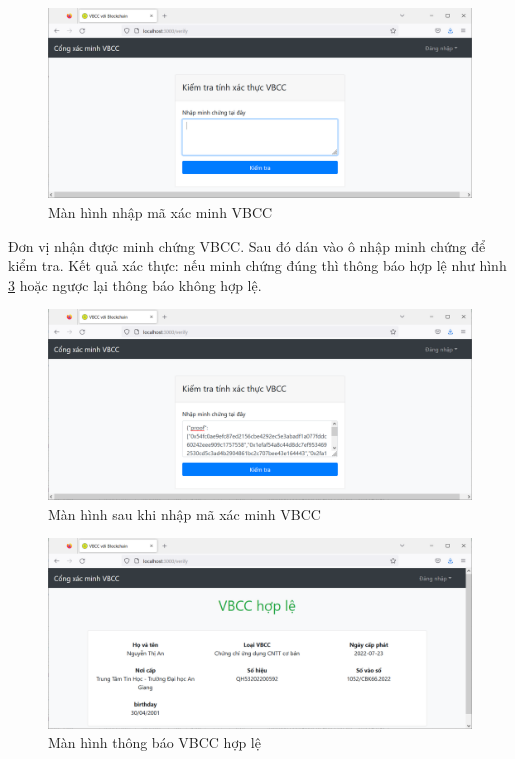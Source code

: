 \begin{figure}[H]
\centering
\includegraphics[width=.9\linewidth]{img/manhinh_donvixacminh_vbegin.PNG}
\caption{Màn hình nhập mã xác minh VBCC}
\label{fig:manhinh_donvixacminh_vbegin}
\end{figure}


Đơn vị nhận được minh chứng VBCC. 
Sau đó dán vào ô nhập minh chứng để kiểm tra.
Kết quả xác thực: nếu minh chứng đúng thì thông báo hợp lệ như hình \ref{fig:xacminh_hople} hoặc ngược lại thông báo không hợp lệ.
\begin{figure}[H]
\centering
\includegraphics[width=.9\linewidth]{img/v_begin.PNG}
\caption{Màn hình sau khi nhập mã xác minh VBCC}
\label{fig:v_begin}
\end{figure}

\begin{figure}[H]
\centering
\includegraphics[width=.9\linewidth]{img/xacminh_hople.PNG}
\caption{Màn hình thông báo VBCC hợp lệ}
\label{fig:xacminh_hople}
\end{figure}

